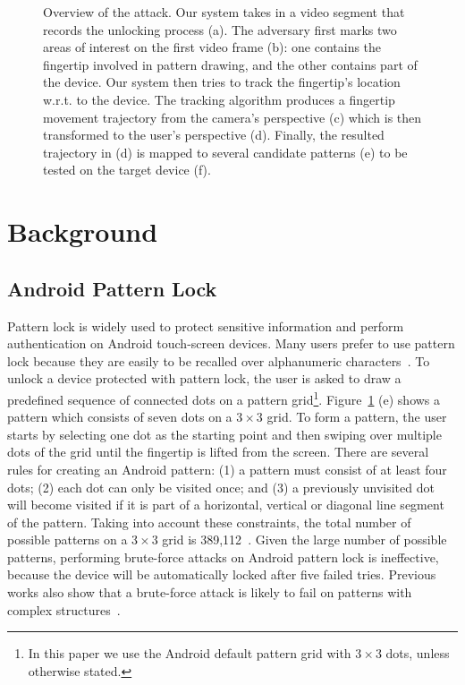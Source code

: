 \begin{figure}[!ht]
    \vspace{-8mm}
    \caption{Overview of the attack.
     Our system takes in a video segment that records the unlocking process (a). The adversary first marks two areas of interest on the first video frame (b): one contains the fingertip involved in pattern drawing, and the other contains part of the device. Our system then tries to track the fingertip's location w.r.t. to the device.
     The tracking algorithm produces a fingertip movement trajectory from the camera's perspective (c) which is then transformed to the user's perspective (d). Finally, the resulted trajectory in (d) is mapped to several candidate patterns (e) to be tested on the target device (f). }
    \label{fig:fig2}
    \vspace{-5mm}
\end{figure}

\vspace{-3mm}
\section{Background}
    \subsection{Android Pattern Lock}
    \label{section: android_pattern_lock}
        Pattern lock is widely used to protect sensitive information and perform authentication on
        Android touch-screen devices. Many users prefer to use pattern lock because they
        are easily to be recalled over alphanumeric characters~\cite{standing1970perception,Weiss2008PassShapes}.
        To unlock a device protected with pattern lock, the user is asked to draw a predefined sequence of connected dots on a pattern grid\footnote{In this paper we use the Android default pattern grid with $3 \times 3$ dots, unless otherwise stated.}.
        Figure~\ref{fig:fig2} (e) shows a pattern which consists of seven dots on a $3 \times 3$ grid.
        To form a
        pattern, the user starts by selecting one dot as the
        starting point and then swiping over multiple dots of the grid until the fingertip is lifted from the screen.
        There are several rules for creating an Android pattern: (1) a pattern must consist
        of at least four dots; (2) each dot can only be visited once; and (3) a previously unvisited dot will
        become visited if it is part of a horizontal, vertical or diagonal
        line segment of the pattern. Taking into account these constraints, the total number of possible patterns
        on a $3\times3$ grid is 389,112~\cite{uellenbeck2013quantifying}.
        Given the large number of possible patterns, performing brute-force attacks on
        Android pattern lock is ineffective, because the device will be
        automatically locked after five failed tries.
        Previous works also show that a brute-force attack is likely to fail on  patterns with complex
        structures~\cite{Kelley2012Guess,Mazurek2013Measuring}.

